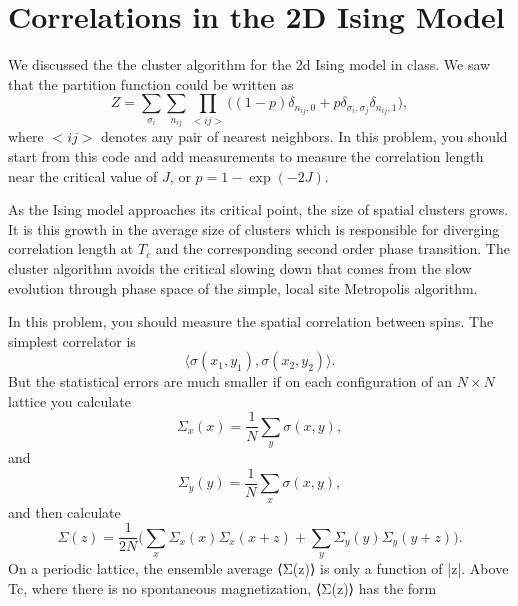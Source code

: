 \section{Correlations in the 2D Ising Model}

We discussed the the cluster algorithm for the 2d Ising model in class. We saw that the
partition function could be written as
%
\begin{equation}
    Z = \sum_{\sigma_i} \sum_{n_{ij}} \prod_{<ij>}
    \bigl((1 - p) \delta_{n_{ij},0} + p \delta_{\sigma_i,\sigma_j} \delta_{n_{ij},1}\bigr),
\end{equation}
%
where \(<ij>\) denotes any pair of nearest neighbors.
In this problem, you should start from this code and add measurements to measure the
correlation length near the critical value of \(J\), or \(p=1 - \exp(-2J)\).

As the Ising model approaches its critical point, the size of spatial clusters grows. It is
this growth in the average size of clusters which is responsible for diverging correlation
length at \(T_c\) and the corresponding second order phase transition. The cluster algorithm
avoids the critical slowing down that comes from the slow evolution through phase space of
the simple, local site Metropolis algorithm.

In this problem, you should measure the spatial correlation between spins. The simplest
correlator is
%
\begin{equation}
    \langle \sigma(x_1, y_1), \sigma(x_2, y_2) \rangle.
\end{equation}
%
But the statistical errors are much smaller if on each configuration of an \(N \times N\)
lattice you calculate
%
\begin{equation}
    \Sigma_x(x) = \frac{ 1 }{ N } \sum_y \sigma(x, y),
\end{equation}
%
and
%
\begin{equation}
    \Sigma_y(y) = \frac{ 1 }{ N } \sum_x \sigma(x, y),
\end{equation}
%
and then calculate
%
\begin{equation}
    \Sigma(z) = \frac{ 1 }{ 2N } \biggl( \sum_x \Sigma_x(x) \Sigma_x(x+z)
    + \sum_y \Sigma_y(y) \Sigma_y(y+z) \biggr).
\end{equation}
%
On a periodic lattice, the ensemble average ⟨Σ(z)⟩ is only a function of |z|. Above
Tc, where there is no spontaneous magnetization, ⟨Σ(z)⟩ has the form
